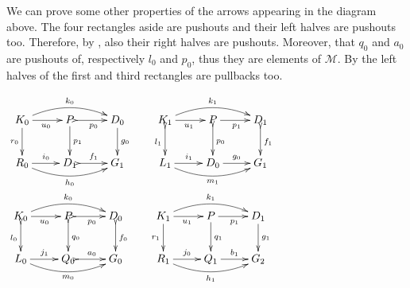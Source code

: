 \documentclass[a4paper,UKenglish,cleveref,pdftex,thm-restate,numberwithinsect,anonymous]{lipics}
\begin{document}
\begin{remark}
	\noindent
	\parbox{5.5cm}{\hspace{15pt}We can prove some other properties of
		the arrows appearing in the diagram above. The four rectangles
		aside are pushouts and their left halves are pushouts
		too. Therefore, by , also their right halves are
		pushouts.  Moreover, that $q_0$ and $a_0$ are pushouts of,
		respectively $l_0$ and $p_0$, thus they are elements of
		$\mathcal{M}$. By  the left halves of the
		first and third rectangles are pullbacks too.}  \parbox{3.5cm}{
		$\xymatrix{K_0 \ar@/^.4cm/[rr]^{k_0}\ar[d]_{r_0}\ar[r]_{u_0}
			&P\ar[d]^{p_1} \ar@{>->}[r]_{p_0} & D_0 \ar[d]^{g_0}&K_1
			\ar@/^.4cm/[rr]^{k_1}\ar@{>->}[d]_{l_1}\ar[r]_{u_1}
			&P\ar@{>->}[d]^{p_0} \ar[r]_{p_1} & D_1 \ar@{>->}[d]^{f_1}\\
			R_0 \ar@/_.4cm/[rr]_{h_0} \ar[r]^{i_0}&D_1 \ar@{>->}[r]^{f_1}
			& G_1&L_1 \ar@/_.4cm/[rr]_{m_1} \ar[r]^{i_1}&D_0\ar[r]^{g_0} &
			G_1}$
		$\xymatrix{K_0
			\ar@/^.4cm/[rr]^{k_0}\ar@{>->}[d]_{l_0}\ar[r]_{u_0}
			&P\ar@{>->}[d]^{q_0} \ar@{>->}[r]_{p_0} & D_0
			\ar@{>->}[d]^{f_0}&K_1
			\ar@/^.4cm/[rr]^{k_1}\ar[d]_{r_1}\ar[r]_{u_1}
			&P\ar[d]^{q_1} \ar[r]_{p_1} & D_1 \ar[d]^{g_1}\\
			L_0 \ar@/_.4cm/[rr]_{m_0} \ar[r]^{j_1}&Q_0 \ar@{>->}[r]^{a_0}
			& G_0&R_1 \ar@/_.4cm/[rr]_{h_1} \ar[r]^{j_0}&Q_1 \ar[r]^{b_1}
			& G_2}$}
\end{remark}


\thmChurch*
\label{thmChurch-proof}
\end{document}
